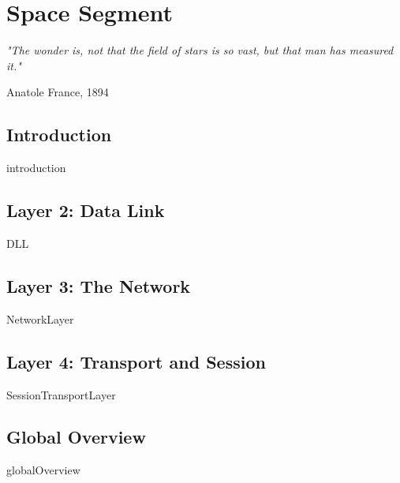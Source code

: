 \chapter{Space Segment}
\newpage
%

\epigraph{\textit{"The wonder is, not that the field of stars is so vast, but that man has measured it."}}{Anatole France, 1894} 

\section{Introduction}
{introduction}

\section{Layer 2: Data Link}
{DLL}

\section{Layer 3: The Network}
{NetworkLayer}

\section{Layer 4: Transport and Session}
{SessionTransportLayer}

\section{Global Overview}
{globalOverview}